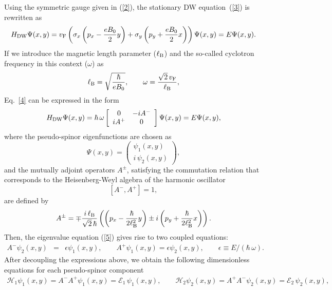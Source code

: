 \documentclass[aps,showpacs,showkeys]{revtex4}
\begin{document}
Using the symmetric gauge  given in (\ref{2}), the stationary DW equation~(\ref{3}) is rewritten as
\begin{equation}\label{4}
	H_{\rm DW}\Psi(x,y)=v_{\rm F}\left(\sigma_x\left(p_x-\frac{eB_0}{2}y\right)+\sigma_y\left(p_y+\frac{eB_0}{2}x\right)\right)\Psi(x,y)=E\Psi(x,y).
\end{equation}
If we introduce the magnetic length parameter ($\ell_{\rm B}$) and the so-called cyclotron frequency in this context ($\omega$) as
\begin{equation}\label{4ymedio}
	\ell_{\rm B}=\sqrt{\frac{\hbar}{eB_0}}, \qquad \omega= \frac{\sqrt{2}\,v_{\rm F}}{\ell_{\rm B}}, 
\end{equation}
Eq.~\eqref{4} can be expressed in the form
\begin{equation}\label{5}
	H_{\rm DW}\Psi(x,y)= \hbar\,\omega \left[\begin{array}{cc}
		0 & -iA^- \\
		iA^+ & 0
	\end{array}\right]\Psi(x,y)=E\Psi(x,y),
\end{equation}
where the pseudo-spinor eigenfunctions are chosen as 
\begin{equation}\label{seis}
	\Psi(x,y)=\left(\begin{array}{c}
		\psi_1(x,y) \\
		i\,\psi_2(x,y)
	\end{array}\right),
\end{equation}
and the mutually adjoint operators $A^\pm$, satisfying the commutation relation that corresponds to the Heisenberg-Weyl algebra of the harmonic oscillator
\begin{equation}\label{7}
	[A^-,A^+]=1,
\end{equation}
are defined by
\begin{equation}\label{6}
A^\pm=\mp\frac{i\, \ell_{\rm B}}{\sqrt{2}\,\hbar}\left(\left(p_x-\frac{\hbar}{2\ell_{\rm B}^2}y\right)\pm i\left(p_y+\frac{\hbar}{2\ell_{\rm B}^2} x\right)\right).
\end{equation}
Then, the eigenvalue equation (\ref{5}) gives rise to two coupled equations:
\begin{eqnarray}
	A^-\psi_2(x,y)&=&\epsilon\psi_1(x,y), \qquad 
	A^+\psi_1(x,y)=\epsilon\psi_2(x,y), \qquad  \epsilon\equiv E/ (\hbar\,\omega). 
\end{eqnarray}
After decoupling the expressions above, we obtain the following dimensionless equations for each pseudo-spinor component
\begin{eqnarray}
	\mathcal{H}_1\psi_1(x,y)=A^-A^+\psi_1(x,y)=\mathcal{E}_1\, \psi_1(x,y), \label{8a} \qquad
	\mathcal{H}_2\psi_2(x,y)=A^+A^-\psi_2(x,y)=\mathcal{E}_2\, \psi_2(x,y), 
\end{eqnarray}
\end{document}
